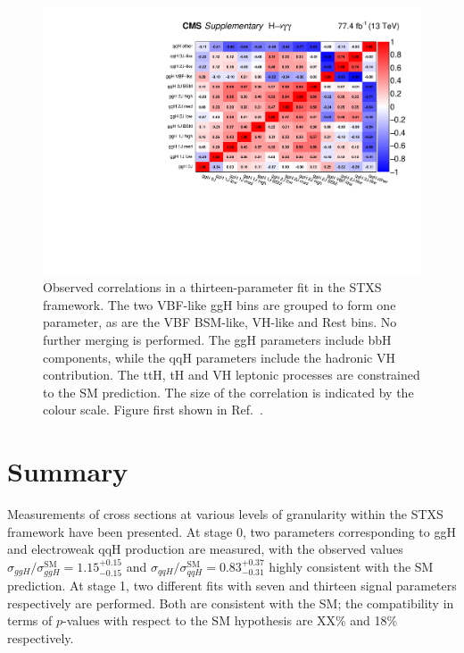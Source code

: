 \begin{figure}[hptb]
  \centering
  \includegraphics[width=\textwidth]{Figures/Results/CorrStage1Min.pdf}
  \caption[Observed correlations in a thirteen-parameter fit in the STXS framework.]
  {
    Observed correlations in a thirteen-parameter fit in the STXS framework. 
    The two VBF-like ggH bins are grouped to form one parameter, 
    as are the VBF BSM-like, VH-like and Rest bins. 
    No further merging is performed. 
    The ggH parameters include bbH components,
    while the qqH parameters include the hadronic VH contribution. 
    The ttH, tH and VH leptonic processes are constrained to the SM prediction. 
    The size of the correlation is indicated by the colour scale.
    Figure first shown in Ref.~\cite{HIG-18-029}.
  }
  \label{fig:results_CorrStage1Min}
\end{figure}

\section{Summary}

Measurements of cross sections at various levels of granularity within the STXS framework 
have been presented.
At stage 0, two parameters corresponding to ggH and electroweak qqH production are measured, 
with the observed values $\sigma_{ggH}/\sigma_{ggH}^{\textrm{SM}} = 1.15_{-0.15}^{+0.15}$ 
and $\sigma_{qqH}/\sigma_{qqH}^{\textrm{SM}} = 0.83_{-0.31}^{+0.37}$ 
highly consistent with the SM prediction.
At stage 1, two different fits with seven and thirteen signal parameters respectively are performed.
Both are consistent with the SM; the compatibility in terms of $p$-values with respect to the SM
hypothesis are XX\% and 18\% respectively.

